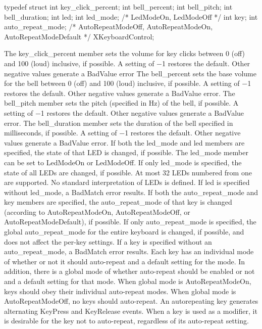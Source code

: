 \documentclass{report}
\begin{document}
\begin{itemize}
\begin{cppcode}
            typedef struct {
                int key_click_percent;
                int bell_percent;
                int bell_pitch;
                int bell_duration;
                int led;
                int led_mode;           /* LedModeOn, LedModeOff */
                int key;
                int auto_repeat_mode;   /* AutoRepeatModeOff, AutoRepeatModeOn, AutoRepeatModeDefault */
            } XKeyboardControl;
            \end{cppcode}
            \bigbreak \noindent 
            The key\_click\_percent member sets the volume for key clicks between 0 (off) and 100 (loud) inclusive, if possible. A setting of −1 restores the default. Other negative values generate a BadValue error
            \bigbreak \noindent 
            The bell\_percent sets the base volume for the bell between 0 (off) and 100 (loud) inclusive, if possible. A setting of −1 restores the default. Other negative values generate a BadValue error. The bell\_pitch member sets the pitch (specified in Hz) of the bell, if possible. A setting of −1 restores the default. Other negative values generate a BadValue error. The bell\_duration member sets the duration of the bell specified in milliseconds, if possible. A setting of −1 restores the default. Other negative values generate a BadValue error.
            \bigbreak \noindent 
            If both the led\_mode and led members are specified, the state of that LED is changed, if possible. The led\_mode member can be set to LedModeOn or LedModeOff. If only led\_mode is specified, the state of all LEDs are changed, if possible. At most 32 LEDs numbered from one are supported. No standard interpretation of LEDs is defined. If led is specified without led\_mode, a BadMatch error results.
            \bigbreak \noindent 
            If both the auto\_repeat\_mode and key members are specified, the auto\_repeat\_mode of that key is changed (according to AutoRepeatModeOn, AutoRepeatModeOff, or AutoRepeatModeDefault), if possible. If only auto\_repeat\_mode is specified, the global auto\_repeat\_mode for the entire keyboard is changed, if possible, and does not affect the per-key settings. If a key is specified without an auto\_repeat\_mode, a BadMatch error results. Each key has an individual mode of whether or not it should auto-repeat and a default setting for the mode. In addition, there is a global mode of whether auto-repeat should be enabled or not and a default setting for that mode. When global mode is AutoRepeatModeOn, keys should obey their individual auto-repeat modes. When global mode is AutoRepeatModeOff, no keys should auto-repeat. An autorepeating key generates alternating KeyPress and KeyRelease events. When a key is used as a modifier, it is desirable for the key not to auto-repeat, regardless of its auto-repeat setting.

\end{itemize}
\end{document}
